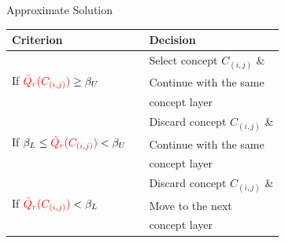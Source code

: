 \documentclass[final]{beamer}
\newlength{\sepwid}
\newlength{\onecolwid}
\newlength{\twocolwid}
\begin{document}
\begin{frame}[t]
\begin{columns}[t]
\begin{column}{\onecolwid}
\begin{block}{Approximate Solution}
\begin{table}[htb!]
\label{tabl: 3regions_}
\centering
\begin{tabular}{@{}lll@{}}
\toprule
\textbf{Criterion}                                                          &  & \textbf{Decision}              \\ \midrule
\multirow{3}{*}{If ${\color{red}\tilde Q_r(C_{(i,j)})}\ge\beta_U$}          &  & Select concept $C_{(i,j)}$ \&  \\
                                                                            &  & Continue with the same         \\
                                                                            &  & concept layer                  \\ \midrule
\multirow{3}{*}{If $\beta_L\le {\color{red}\tilde Q_r(C_{(i,j)})}<\beta_U$} &  & Discard concept $C_{(i,j)}$ \& \\
                                                                            &  & Continue with the same         \\
                                                                            &  & concept layer                  \\ \midrule
\multirow{3}{*}{If ${\color{red}\tilde Q_r(C_{(i,j)})}<\beta_L$}            &  & Discard concept $C_{(i,j)}$ \& \\
                                                                            &  & Move to the next               \\
                                                                            &  & concept layer                  \\ \bottomrule
\end{tabular}
\end{table}
\end{block}





\end{column} %

\begin{column}{\sepwid}\end{column} %

\begin{column}{\twocolwid} %


\end{column}
\end{columns}
\end{frame}
\end{document}
